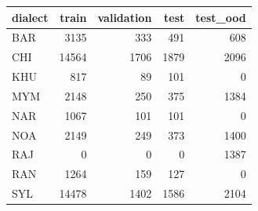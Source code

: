\begin{tabular}{lrrrr}
\toprule
dialect & train & validation & test & test\_ood \\
\midrule
BAR & 3135 & 333 & 491 & 608 \\
CHI & 14564 & 1706 & 1879 & 2096 \\
KHU & 817 & 89 & 101 & 0 \\
MYM & 2148 & 250 & 375 & 1384 \\
NAR & 1067 & 101 & 101 & 0 \\
NOA & 2149 & 249 & 373 & 1400 \\
RAJ & 0 & 0 & 0 & 1387 \\
RAN & 1264 & 159 & 127 & 0 \\
SYL & 14478 & 1402 & 1586 & 2104 \\
\bottomrule
\end{tabular}
